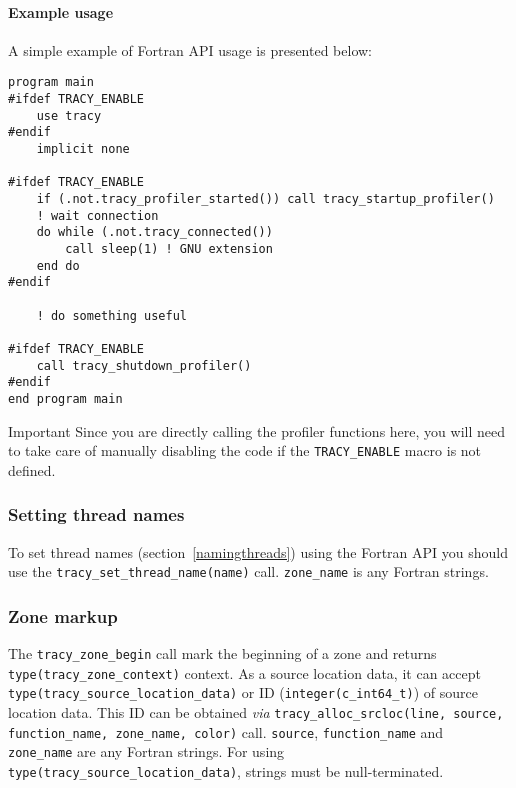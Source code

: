 \documentclass[hidelinks,titlepage,a4paper,twoside]{article}
\begin{document}
\paragraph{Example usage}

A simple example of Fortran API usage is presented below:

\begin{lstlisting}
program main
#ifdef TRACY_ENABLE
    use tracy
#endif
    implicit none

#ifdef TRACY_ENABLE
    if (.not.tracy_profiler_started()) call tracy_startup_profiler()
    ! wait connection
    do while (.not.tracy_connected())
        call sleep(1) ! GNU extension
    end do
#endif

    ! do something useful

#ifdef TRACY_ENABLE
    call tracy_shutdown_profiler()
#endif
end program main
\end{lstlisting}

\begin{bclogo}[
noborder=true,
couleur=black!5,
logo=\bcbombe
]{Important}
Since you are directly calling the profiler functions here, you will need to take care of manually disabling the code if the \texttt{TRACY\_ENABLE} macro is not defined.
\end{bclogo}

\subsubsection{Setting thread names}

To set thread names (section~\ref{namingthreads}) using the Fortran API you should use the \texttt{tracy\_set\_thread\_name(name)} call.
\texttt{zone\_name} is any Fortran strings.

\subsubsection{Zone markup}

The \texttt{tracy\_zone\_begin} call mark the beginning of a zone and returns \texttt{type(tracy\_zone\_context)} context.
As a source location data, it can accept \texttt{type(tracy\_source\_location\_data)} or ID (\texttt{integer(c\_int64\_t)}) of source location data.
This ID can be obtained \textit{via} \texttt{tracy\_alloc\_srcloc(line, source, function\_name, zone\_name, color)} call.
\texttt{source}, \texttt{function\_name} and \texttt{zone\_name} are any Fortran strings.
For using \texttt{type(tracy\_source\_location\_data)}, strings must be null-terminated.
\end{document}
